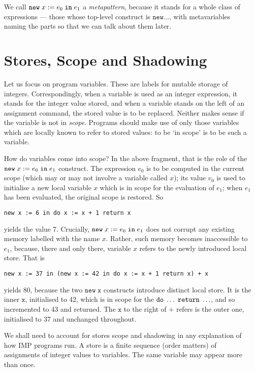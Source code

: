 \documentclass{article}
\begin{document}
We call $\mathtt{new}\;x\;\mathtt{:=}\;e_0\;\mathtt{in}\;e_1$ a \emph{metapattern}, because it stands for a whole class of expressions --- those whose top-level construct is $\mathtt{new}\ldots$, with metavariables naming the parts so that we can talk about them later.


\section{Stores, Scope and Shadowing}

Let us focus on program variables. These are labels for mutable storage of integers. Correspondingly, when a variable is used as an integer expression, it stands for the integer value stored, and when a variable stands on the left of an assignment command, the stored value is to be replaced. Neither makes sense if the variable is not in \emph{scope}. Programs should make use of only those variables which are locally known to refer to stored values: to be `in scope' is to be such a variable.

How do variables come into scope? In the above fragment, that is the role of the $\mathtt{new}\;x\;\mathtt{:=}\;e_0\;\mathtt{in}\;e_1$ construct. The expression $e_0$ is to be computed in the current scope (which may or may not involve a variable called $x$); its value $v_0$ is used to initialise a new local variable $x$ which is in scope for the evaluation of $e_1$; when $e_1$ has been evaluated, the original scope is restored. So

\begin{verbatim}
new x := 6 in do x := x + 1 return x
\end{verbatim}

yields the value 7. Crucially, $\mathtt{new}\;x\;\mathtt{:=}\;e_0\;\mathtt{in}\;e_1$ does not corrupt any existing memory labelled with the name $x$. Rather, such memory becomes inaccessible to $e_1$, because, there and only there, variable $x$ refers to the newly introduced local store. That is

\begin{verbatim}
new x := 37 in (new x := 42 in do x := x + 1 return x) + x
\end{verbatim}

yields 80, because the two $\mathtt{new\;x}$ constructs introduce distinct local store. It is the inner $\mathtt{x}$, initialised to 42, which is in scope for the $\mathtt{do}\;\ldots\;\mathtt{return}\;\ldots$, and so incremented to 43 and returned. The $\mathtt{x}$ to the right of $+$ refers is the outer one, initialised to 37 and unchanged throughout.

We shall need to account for stores scope and shadowing in any explanation of how IMP programs run. A store is a finite sequence (order matters) of assignments of integer values to variables. The same variable may appear more than once.
\end{document}

